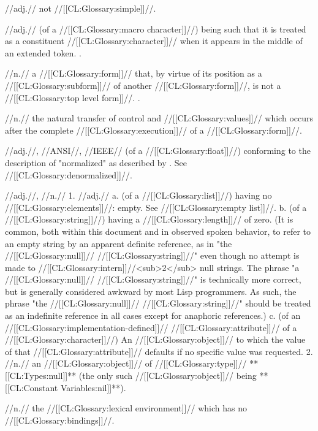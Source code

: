  //adj.// not //[[CL:Glossary:simple]]//.

 //adj.// (of a //[[CL:Glossary:macro character]]//) being such that it is treated as a constituent //[[CL:Glossary:character]]// when it appears in the middle of an extended token. \Seesection\ReaderAlgorithm.

 //n.// a //[[CL:Glossary:form]]// that, by virtue of its position as a //[[CL:Glossary:subform]]// of another //[[CL:Glossary:form]]//, is not a //[[CL:Glossary:top level form]]//. \Seesection\TopLevelForms.

 //n.// the natural transfer of control and //[[CL:Glossary:values]]// which occurs after the complete //[[CL:Glossary:execution]]// of a //[[CL:Glossary:form]]//.

 //adj.//, //ANSI//, //IEEE// (of a //[[CL:Glossary:float]]//) conforming to the description of "normalized" as described by {\IEEEFloatingPoint}. See //[[CL:Glossary:denormalized]]//.

 //adj.//, //n.// 1. //adj.// a. (of a //[[CL:Glossary:list]]//) having no //[[CL:Glossary:elements]]//: empty. See //[[CL:Glossary:empty list]]//. b. (of a //[[CL:Glossary:string]]//) having a //[[CL:Glossary:length]]// of zero. (It is common, both within this document and in observed spoken behavior, to refer to an empty string by an apparent definite reference, as in "the //[[CL:Glossary:null]]// //[[CL:Glossary:string]]//" even though no attempt is made to //[[CL:Glossary:intern]]//<sub>2</sub> null strings. The phrase "a //[[CL:Glossary:null]]// //[[CL:Glossary:string]]//" is technically more correct, but is generally considered awkward by most Lisp programmers. As such, the phrase "the //[[CL:Glossary:null]]// //[[CL:Glossary:string]]//" should be treated as an indefinite reference in all cases except for anaphoric references.) c. (of an //[[CL:Glossary:implementation-defined]]// //[[CL:Glossary:attribute]]// of a //[[CL:Glossary:character]]//) An //[[CL:Glossary:object]]// to which the value of that //[[CL:Glossary:attribute]]// defaults if no specific value was requested. 2. //n.// an //[[CL:Glossary:object]]// of //[[CL:Glossary:type]]// **[[CL:Types:null]]** (the only such //[[CL:Glossary:object]]// being **[[CL:Constant Variables:nil]]**).

 //n.// the //[[CL:Glossary:lexical environment]]// which has no //[[CL:Glossary:bindings]]//.

